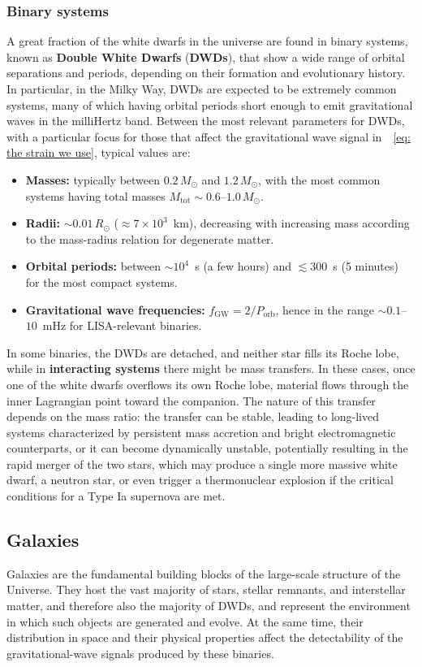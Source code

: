 \subsubsection{Binary systems}
A great fraction of the white dwarfs in the universe are found in binary systems, known as \textbf{Double White Dwarfs} (\textbf{DWDs}), that show a wide range of orbital separations and periods, depending on their formation and evolutionary history.  
In particular, in the Milky Way, DWDs are expected to be extremely common systems, many of which having orbital periods short enough to emit gravitational waves in the milliHertz band.  
Between the most relevant parameters for DWDs, with a particular focus for those that affect the gravitational wave signal in~~\eqref{eq: the strain we use}, typical values are:
\begin{itemize}
    \item \textbf{Masses:} typically between $0.2\,M_\odot$ and $1.2\,M_\odot$, with the most common systems having total masses $M_{\mathrm{tot}} \sim 0.6$--$1.0\,M_\odot$.
    \item \textbf{Radii:} $\sim 0.01\,R_\odot$ ($\approx 7\times 10^{3}$~km), decreasing with increasing mass according to the mass-radius relation for degenerate matter.
    \item \textbf{Orbital periods:} between $\sim 10^{4}$~s (a few hours) and $\lesssim 300$~s (5 minutes) for the most compact systems.
    \item \textbf{Gravitational wave frequencies:} $f_{\mathrm{GW}} = 2/P_{\mathrm{orb}}$, hence in the range $\sim 0.1$--$10$~mHz for LISA-relevant binaries.
\end{itemize}
In some binaries, the DWDs are detached, and neither star fills its Roche lobe, while in \textbf{interacting systems} there might be mass transfers.
In these cases, once one of the white dwarfs overflows its own Roche lobe, material flows through the inner Lagrangian point toward the companion.
The nature of this transfer depends on the mass ratio: the transfer can be stable, leading to long-lived systems characterized by persistent mass accretion and bright electromagnetic counterparts, or it can become dynamically unstable, potentially resulting in the rapid merger of the two stars, which may produce a single more massive white dwarf, a neutron star, or even trigger a thermonuclear explosion if the critical conditions for a Type Ia supernova are met.


\subsection{Galaxies}
Galaxies are the fundamental building blocks of the large-scale structure of the Universe. 
They host the vast majority of stars, stellar remnants, and interstellar matter, and therefore also the majority of DWDs, and represent the environment in which such objects are generated and evolve.  
At the same time, their distribution in space and their physical properties affect the detectability of the gravitational-wave signals produced by these binaries.  

